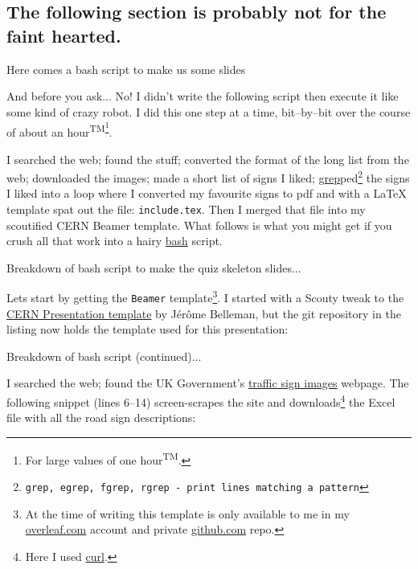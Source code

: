 \subsection{The following section is probably not for the faint hearted.}

{
\begin{frame}{Here comes a bash script to make us some slides}
\footnotesize
\parbox{\textwidth}{\alert{And before you ask...} No! I didn't write the following script then execute it like some kind of crazy robot. I did this one step at a time, bit--by--bit over the course of about an hour\textsuperscript{TM\footnote{For large values of one hour\textsuperscript{TM}.}}.}

\parbox{\textwidth}{I searched the web; found the stuff; converted the format of the long list from the web; downloaded the images; made a short list of signs I liked; \href{https://en.wikipedia.org/wiki/Grep}{grep}ped\footnote{\tt grep, egrep, fgrep, rgrep - print lines matching a pattern} the signs I liked into a loop where I converted my favourite signs to pdf and with a \LaTeX{} template spat out the file: {\tt include.tex}. Then I merged that file into my scoutified CERN Beamer template.  What follows is what you might get if you crush all that work into a hairy \href{https://www.gnu.org/software/bash/}{bash} script.
\hfill
\hyperlink{quizslides}{}
}
\end{frame}
}

\begin{frame}{Breakdown of bash script to make the quiz skeleton slides...}
\parbox{\textwidth}{Lets start by getting the {\tt Beamer} template\footnote{At the time of writing this template is only available to me in my \href{https://www.overleaf.com/project/5f1c704829d3e800016ed5c3}{overleaf.com} account and private \href{https://github.com/nimpo/GreyWolfsScoutsBeamerTheme}{github.com} repo.}. I started with a Scouty tweak to the \href{https://www.overleaf.com/latex/templates/cern-presentation-title/mgnwzmtgtvkw}{CERN Presentation template} by J\'er\^ome Belleman, but the git repository in the listing now holds the template used for this presentation:}
\tiny
\end{frame}

\begin{frame}{Breakdown of bash script (continued)...}
\parbox{\textwidth}{\small I searched the web; found the UK Government's \href{https://www.gov.uk/guidance/traffic-sign-images}{traffic sign images} webpage. The following snippet (lines 6--14) screen-scrapes the site and downloads\footnote{Here I used \href{https://curl.haxx.se/}{curl}.} the Excel file with all the road sign descriptions:}
\tiny

\end{frame}

